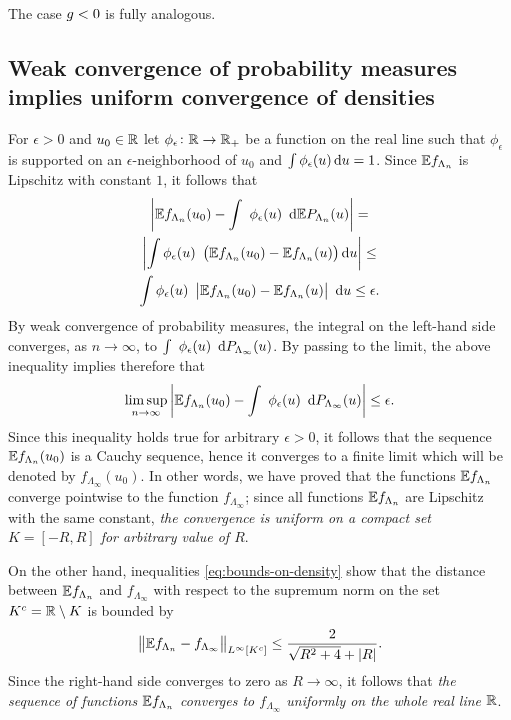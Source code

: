 \documentclass[12pt,usenames,dvipsnames,svgnames,table]{amsart}
\begin{document}
\medskip

The case $g<0$ is fully analogous.

\subsection{Weak convergence of probability measures implies uniform convergence of densities}
For $\epsilon>0$ and $u_0\in\mathbb{R}$ let $\phi_\epsilon\colon \mathbb{R}\to\mathbb{R}_+$ be a function 
on the real line such that $\phi_\epsilon$ is supported on an $\epsilon$-neighborhood of $u_0$
and $\int \phi_\epsilon(u) \dif u = 1$. 
Since $\mathbb{E} f_{\Lambda_n}$ is Lipschitz with constant $1$, it follows that
\begin{multline} 
\label{eq:Lipschitz-is-good}
\left| \E f_{\Lambda_n}(u_0) - \int\ \phi_\epsilon(u)\ \dif \E P_{\Lambda_n}(u) \right| =\\
\left| \int \phi_\epsilon(u)\ \left( \E f_{\Lambda_n} (u_0) - \E f_{\Lambda_n}(u)\right)  \dif u \right| \leq 
\\ 
\int \phi_\epsilon(u)\ \left|\E f_{\Lambda_n} (u_0) - \E f_{\Lambda_n}(u)\right|\  \dif u\leq \epsilon.
\end{multline}
By weak convergence of probability measures, the integral on the left-hand side converges, 
as $n\to\infty$, to $\int\ \phi_\epsilon(u)\ \dif P_{\Lambda_\infty}(u)$. By passing to the limit, the above inequality implies
therefore that
\[
\limsup_{n\to\infty}
\left| \E f_{\Lambda_n}(u_0) - \int\ \phi_\epsilon(u)\ \dif P_{\Lambda_\infty}(u) \right| 
\leq \epsilon.
\]
Since this inequality holds true for arbitrary $\epsilon>0$, it follows that the sequence 
$\mathbb{E} f_{\Lambda_n}(u_0)$ is a Cauchy sequence, hence it converges to a finite limit
which will be denoted by $f_{\Lambda_\infty}(u_0)$.
In other words, we have proved that the functions $\mathbb{E} f_{\Lambda_n}$ converge pointwise
to the function $f_{\Lambda_\infty}$; since all functions $\mathbb{E} f_{\Lambda_n}$ are Lipschitz with the same constant,
\emph{the convergence is uniform on a compact set $K=[-R,R]$ for arbitrary value of $R$}.

On the other hand, inequalities \eqref{eq:bounds-on-density} show that
the distance between $\mathbb{E} f_{\Lambda_n}$ and $f_{\Lambda_\infty}$
with respect to the supremum norm on the set $K^c=\mathbb{R}\setminus K$
is bounded by
\begin{equation}
\label{eq:sup-bound}
\left\| \mathbb{E} f_{\Lambda_n} - f_{\Lambda_\infty} \right\|_{L^{\infty}[K^c]} \leq
\frac{2}{\sqrt{R^2+4}+|R|}. 
\end{equation}
Since the right-hand side converges to zero as $R\to\infty$, it follows that
\emph{the sequence of functions $\mathbb{E} f_{\Lambda_n}$ converges to $f_{\Lambda_\infty}$ 
	uniformly on the whole real line $\mathbb{R}$}.
\end{document}
